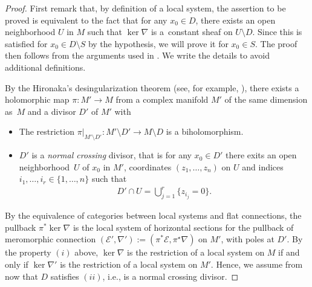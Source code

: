 \documentclass[10pt,a4paper]{amsart}
\numberwithin{equation}{section}
\begin{document}
\begin{proof} First remark that, by definition of a local system, the assertion to be proved is equivalent to the fact that for any $x_0\in D$, there exists an open neighborhood $U$ in $M$ such that $\ker  \nabla$ is a~constant sheaf on $U\setminus D$. Since this is satisfied for $x_0 \in D\setminus S$ by the hypothesis, we will prove it for $x_0\in S$. The proof then follows from the arguments used in \cite[Chapter~II, Theorems~5.2 and~5.4]{Deligne}. We write the details to avoid additional definitions.

By the Hironaka's desingularization theorem (see, for example, \cite[Theorem 7.13]{GrauertPeternellRemmert}), there exists a holomorphic map $\pi\colon M'\longrightarrow M$ from a complex manifold $M'$ of the same dimension as~$M$ and a divisor $D'$ of $M'$ with
\begin{itemize}\itemsep=0pt
 \item[(i)] The restriction $\pi|_{M'\setminus D'}\colon M'\setminus D' \longrightarrow M\setminus D$ is a biholomorphism.
 \item[(ii)] $D'$ is a \textit{normal crossing} divisor, that is for any $x_0\in D'$ there exits an open neighborhood~$U$ of $x_0$ in $M'$, coordinates $(z_1,\dots,z_n)$ on $U$ and indices $i_1,\dots,i_r\in \{1,\dots,n\}$ such that
 \begin{gather*}%
 D'\cap U= \bigcup_{j=1}^{r} \{z_{i_j}=0\}.\end{gather*}
\end{itemize}

By the equivalence of categories between local systems and flat connections, the pullback $\pi^* \ker  \nabla$ is the local system of horizontal sections for the pullback of meromorphic connection $(\mathcal{E}',\nabla'):=(\pi^* \mathcal{E},\pi^\star \nabla)$ on $M'$, with poles at $D'$. By the property $(i)$ above, $\ker  \nabla$ is the restriction of a local system on $M$ if and only if $\ker  \nabla'$ is the restriction of a local system on $M'$. Hence, we assume from now that $D$ satisfies $(ii)$, i.e., is a normal crossing divisor.


\end{proof}
\end{document}
